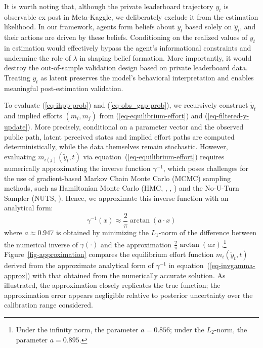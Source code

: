 \documentclass[mnsc]{informs3}
\begin{document}
It is worth noting that, although the private leaderboard trajectory $y_t$ is observable ex post in Meta-Kaggle, we deliberately exclude it from the estimation likelihood.
In our framework, agents form beliefs about $y_t$ based solely on $\hat{y}_t$, and their actions are driven by these beliefs.
Conditioning on the realized values of $y_t$ in estimation would effectively bypass the agent’s informational constraints and undermine the role of $\lambda$ in shaping belief formation.
More importantly, it would destroy the out-of-sample validation design based on private leaderboard data.
Treating $y_t$ as latent preserves the model’s behavioral interpretation and enables meaningful post-estimation validation.

To evaluate (\ref{eq-ihpp-prob}) and (\ref{eq-obs_gap-prob}), we recursively construct $\tilde{y}_t$ and implied efforts $(m_i,m_j)$ from (\ref{eq-equilibrium-effort}) and (\ref{eq-filtered-y-update}).
More precisely, conditional on a parameter vector and the observed public path, latent perceived states and implied effort paths are computed deterministically, while the data themselves remain stochastic.
However, evaluating $m_{i(j)}(\tilde{y}_t, t)$ via equation~(\ref{eq-equilibrium-effort}) requires numerically approximating the inverse function $\gamma^{-1}$, which poses challenges for the use of gradient-based Markov Chain Monte Carlo (MCMC) sampling methods, such as Hamiltonian Monte Carlo (HMC, \citealt{neal1996bayesian}, \citealt{neal2011mcmc}, \citealt{betancourt2017conceptual}) and the No-U-Turn Sampler (NUTS, \citealt{hoffman2014NUTS}).
Hence, we approximate this inverse function with an analytical form:
\begin{equation}\label{eq-invgamma-approx}
\gamma^{-1}(x) \approx \frac{2}{\pi}\arctan(a \cdot x)
\end{equation}
where $a \approx 0.947$ is obtained by minimizing the $L_1$-norm of the difference between the numerical inverse of $\gamma(\cdot)$ and the approximation $\frac{2}{\pi}\arctan(ax)$.\footnote{Under the infinity norm, the parameter $a = 0.856$; under the $L_2$-norm, the parameter $a=0.895$.}
Figure~\ref{fig-approximation} compares the equilibrium effort function $m_i(\tilde{y}_t, t)$ derived from the approximate analytical form of $\gamma^{-1}$ in equation~(\ref{eq-invgamma-approx}) with that obtained from the numerically accurate solution.
As illustrated, the approximation closely replicates the true function; the approximation error appears negligible relative to posterior uncertainty over the calibration range considered.
\end{document}
